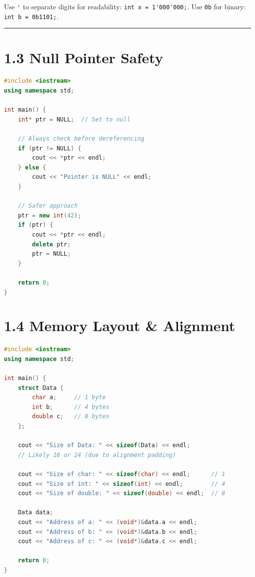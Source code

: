 Use \passthrough{\lstinline!'!} to separate digits for readability:
\passthrough{\lstinline!int x = 1'000'000;!}. Use
\passthrough{\lstinline!0b!} for binary:
\passthrough{\lstinline!int b = 0b1101;!}.

\begin{center}\rule{0.5\linewidth}{0.5pt}\end{center}

\hypertarget{null-pointer-safety}{%
\section{1.3 Null Pointer Safety}\label{null-pointer-safety}}

\begin{lstlisting}[language={C++}]
#include <iostream>
using namespace std;

int main() {
    int* ptr = NULL;  // Set to null
    
    // Always check before dereferencing
    if (ptr != NULL) {
        cout << *ptr << endl;
    } else {
        cout << "Pointer is NULL" << endl;
    }
    
    // Safer approach
    ptr = new int(42);
    if (ptr) {
        cout << *ptr << endl;
        delete ptr;
        ptr = NULL;
    }
    
    return 0;
}
\end{lstlisting}

\hypertarget{memory-layout-alignment}{%
\section{1.4 Memory Layout \& Alignment}\label{memory-layout-alignment}}

\begin{lstlisting}[language={C++}]
#include <iostream>
using namespace std;

int main() {
    struct Data {
        char a;     // 1 byte
        int b;      // 4 bytes
        double c;   // 8 bytes
    };
    
    cout << "Size of Data: " << sizeof(Data) << endl;
    // Likely 16 or 24 (due to alignment padding)
    
    cout << "Size of char: " << sizeof(char) << endl;      // 1
    cout << "Size of int: " << sizeof(int) << endl;        // 4
    cout << "Size of double: " << sizeof(double) << endl;  // 8
    
    Data data;
    cout << "Address of a: " << (void*)&data.a << endl;
    cout << "Address of b: " << (void*)&data.b << endl;
    cout << "Address of c: " << (void*)&data.c << endl;
    
    return 0;
}
\end{lstlisting}

